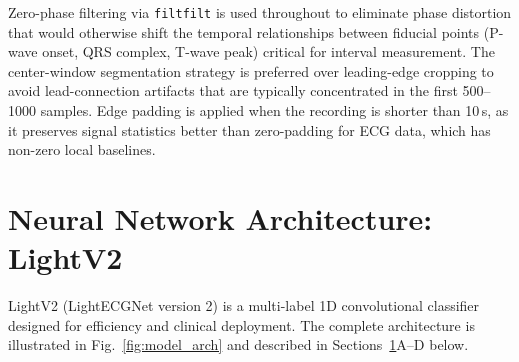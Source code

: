 \documentclass[journal]{IEEEtran}
\begin{document}
Zero-phase filtering via \texttt{filtfilt} is used throughout to
eliminate phase distortion that would otherwise shift the temporal
relationships between fiducial points (P-wave onset, QRS complex,
T-wave peak) critical for interval measurement.
The center-window segmentation strategy is preferred over
leading-edge cropping to avoid lead-connection artifacts that
are typically concentrated in the first 500–1000 samples.
Edge padding is applied when the recording is shorter than 10\,s,
as it preserves signal statistics better than zero-padding for
ECG data, which has non-zero local baselines.

\section{Neural Network Architecture: LightV2}
\label{sec:model}

LightV2 (LightECGNet version 2) is a multi-label 1D convolutional
classifier designed for efficiency and clinical deployment.
The complete architecture is illustrated in Fig.~\ref{fig:model_arch}
and described in Sections~\ref{sec:model}A--D below.
\end{document}
